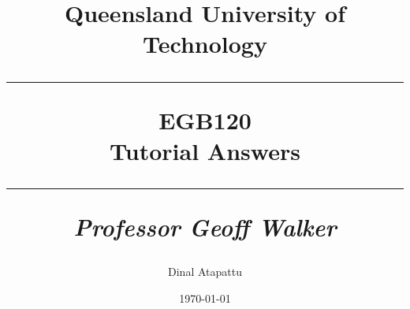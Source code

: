 \documentclass[oneside]{book}
\begin{document}
\pagestyle{fancy}
    \fancyhf{}
\fancyhead[R]{\nouppercase{\leftmark}}
\renewcommand{\footrulewidth}{0.4pt}
    \title{
            Queensland University of Technology\\
            \rule{\linewidth}{0.5pt}
        \centering
        \textbf{EGB120} \\
        Tutorial Answers\\
        \vspace{0.4cm}
        \rule{\linewidth}{1.5pt}
        \small{\textit{Professor Geoff Walker}}
    }
    \author{Dinal Atapattu}
    \date{\today}
    \maketitle
    \thispagestyle{empty}
    \tableofcontents
        
\end{document}
